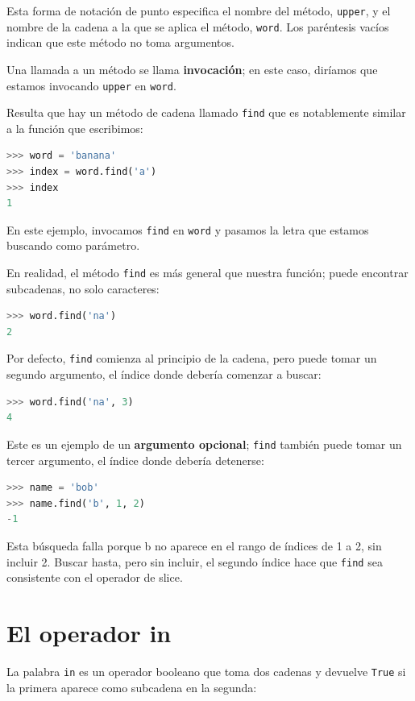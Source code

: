 Esta forma de notación de punto especifica el nombre del método, \texttt{upper}, y el nombre de la cadena a la que se aplica el método, \texttt{word}. Los paréntesis vacíos indican que este método no toma argumentos.

Una llamada a un método se llama \textbf{invocación}; en este caso, diríamos que estamos invocando \texttt{upper} en \texttt{word}.

Resulta que hay un método de cadena llamado \texttt{find} que es notablemente similar a la función que escribimos:

\begin{lstlisting}[language=Python]
>>> word = 'banana'
>>> index = word.find('a')
>>> index
1
\end{lstlisting}

En este ejemplo, invocamos \texttt{find} en \texttt{word} y pasamos la letra que estamos buscando como parámetro.

En realidad, el método \texttt{find} es más general que nuestra función; puede encontrar subcadenas, no solo caracteres:

\begin{lstlisting}[language=Python]
>>> word.find('na')
2
\end{lstlisting}

Por defecto, \texttt{find} comienza al principio de la cadena, pero puede tomar un segundo argumento, el índice donde debería comenzar a buscar:

\begin{lstlisting}[language=Python]
>>> word.find('na', 3)
4
\end{lstlisting}

Este es un ejemplo de un \textbf{argumento opcional}; \texttt{find} también puede tomar un tercer argumento, el índice donde debería detenerse:

\begin{lstlisting}[language=Python]
>>> name = 'bob'
>>> name.find('b', 1, 2)
-1
\end{lstlisting}

Esta búsqueda falla porque b no aparece en el rango de índices de 1 a 2, sin incluir 2. Buscar hasta, pero sin incluir, el segundo índice hace que \texttt{find} sea consistente con el operador de slice.

\section{El operador in}

La palabra \texttt{in} es un operador booleano que toma dos cadenas y devuelve \texttt{True} si la primera aparece como subcadena en la segunda:

